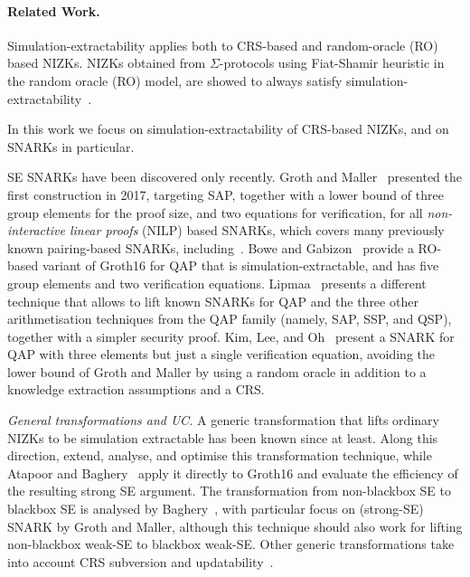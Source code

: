 \documentclass[a4paper, 9pt]{article}
\newcommand{\MK}[1]{}
\newcommand{\Gro}{\textsf{Groth16}}
\begin{document}


\paragraph{Related Work.}
 Simulation-extractability applies both to CRS-based and random-oracle (RO)
 based NIZKs. NIZKs obtained from
 $\Sigma$-protocols using Fiat-Shamir heuristic in the random oracle
 (RO) model, are showed to always satisfy
 simulation-extractability~\cite{DBLP:conf/indocrypt/FaustKMV12}.
 \MK{I suspect both Mary and I are working on this already, no need to make it
   even more apparent that this is interesting territory :): Although
 this result does not immediately extend to other FS-transformed
 NIZKs,}
 In this work we focus on simulation-extractability of
 CRS-based NIZKs, and on SNARKs in particular.

 SE SNARKs have been discovered only recently. Groth and
 Maller~\cite{gm17} presented the first construction in 2017,
 targeting SAP, together with a lower bound of three group elements for
 the proof size, and two equations for verification, for all
 \emph{non-interactive linear proofs} (NILP) based SNARKs, which covers many
 previously known pairing-based SNARKs, including~\cite{gro16,gm17}. Bowe and Gabizon~\cite{bowe2018making} provide a
 RO-based variant of \Gro{} for QAP that is simulation-extractable,
 and has five group elements and two verification
 equations. Lipmaa~\cite{lip19} presents a different technique that
 allows to lift known SNARKs for QAP and the three other arithmetisation
 techniques from the QAP family (namely, SAP, SSP, and QSP), together
 with a simpler security proof.\MK{Doesn't he do QAP as well?} Kim, Lee, and Oh~\cite{kim2019qap}
 present a SNARK for QAP with three elements but just a single
 verification equation, avoiding the lower bound of Groth and Maller
 by using a random oracle in addition to a knowledge extraction
 assumptions and a CRS.\smallskip

 \noindent\emph{General transformations and UC.} A generic
 transformation that lifts ordinary NIZKs to be simulation extractable
 has been known since \cite{de2001robust} at least. Along this
 direction, \cite{kosba2015use, kosba2015c} extend, analyse, and
 optimise this transformation technique, while Atapoor and
 Baghery~\cite{atapoor2019simulation} apply it directly to \Gro{} and
 evaluate the efficiency of the resulting strong SE argument. The
 transformation from non-blackbox SE to blackbox SE is analysed by
 Baghery~\cite{baghery2019efficiency}, with particular focus on
 (strong-SE) SNARK by Groth and Maller, although this technique should
 also work for lifting non-blackbox weak-SE to blackbox weak-SE. Other
 generic transformations take into account CRS subversion and
 updatability~\cite{abdolmaleki2020lift, bagherytiramisu}.
\end{document}
